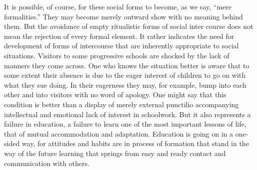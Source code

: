 It is possible, of course, for these social forms to become, as we say, \enquote{mere 
formalities.} They may become merely outward show with no meaning behind them. But 
the avoidance of empty ritualistic forms of social inter course does not mean the rejection 
of every formal element. It rather indicates the need for development of forms of 
intercourse that are inherently appropriate to social situations. Visitors to some 
progressive schools are shocked by the lack of manners they come across. One who 
knows the situation better is aware that to some extent their absence is due to the eager 
interest of children to go on with what they sue doing. In their eagerness they may, for example, bump into each other and into visitors with no word of apology. One might say 
that this condition is better than a display of merely external punctilio accompanying 
intellectual and emotional lack of interest in schoolwork. But it also represents a failure 
in education, a failure to learn one of the most important lessons of life, that of mutual 
accommodation and adaptation. Education is going on in a one-sided way, for attitudes 
and habits are in process of formation that stand in the way of the future learning that 
springs from easy and ready contact and communication with others. 
